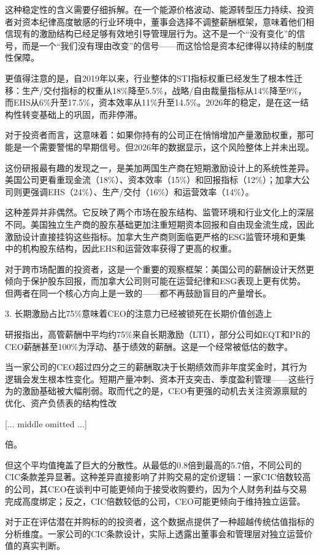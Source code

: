 \documentclass[11pt]{ctexart}
\begin{document}
这种稳定性的含义需要仔细拆解。在一个能源价格波动、能源转型压力持续、投资者对资本纪律高度敏感的行业环境中，董事会选择不调整薪酬框架，意味着他们相信现有的激励结构已经足够有效地引导管理层行为。这不是一个“没有变化”的信号，而是一个“我们没有理由改变”的信号——而这恰恰是资本纪律得以持续的制度性保障。

更值得注意的是，自2019年以来，行业整体的STI指标权重已经发生了根本性迁移：生产/交付指标的权重从18\%降至5.5\%，战略/自由裁量指标从14\%降至9\%，而EHS从6\%升至17.5\%，资本效率从11\%升至14.5\%。2026年的稳定，是在这一结构性转变基础上的巩固，而非停滞。

对于投资者而言，这意味着：如果你持有的公司正在悄悄增加产量激励权重，那可能是一个需要警惕的早期信号。但2026年的数据显示，这个风险整体上并未出现。

这份研报最有趣的发现之一，是美加两国生产商在短期激励设计上的系统性差异。美国公司更看重现金流（18\%）、资本效率（15\%）和回报指标（12\%）；加拿大公司则更强调EHS（24\%）、生产/交付（16\%）和运营效率（14\%）。

这种差异并非偶然。它反映了两个市场在股东结构、监管环境和行业文化上的深层不同。美国独立生产商的股东基础更加注重短期资本回报和自由现金流生成，因此激励设计直接挂钩这些指标。加拿大生产商则面临更严格的ESG监管环境和更集中的机构股东结构，因此EHS和运营效率获得了更高的权重。

对于跨市场配置的投资者，这是一个重要的观察框架：美国公司的薪酬设计天然更倾向于保护股东回报，而加拿大公司则可能在运营纪律和ESG表现上更有优势。但两者在同一个核心方向上是一致的——都不再鼓励盲目的产量增长。

3. 长期激励占比75\%意味着CEO的注意力已经被锁死在长期价值创造上

研报指出，高管薪酬中平均约75\%来自长期激励（LTI），部分公司如EQT和PR的CEO薪酬甚至100\%为浮动、基于绩效的薪酬。这是一个经常被低估的数字。

当一家公司的CEO超过四分之三的薪酬取决于长期绩效而非年度奖金时，其行为逻辑会发生根本性变化。短期产量冲刺、资本开支突击、季度盈利管理——这些行为的激励基础被大幅削弱。取而代之的是，CEO有更强的动机去关注资源禀赋的优化、资产负债表的结构性改

[... middle omitted ...]

倍。

但这个平均值掩盖了巨大的分散性。从最低的0.8倍到最高的5.7倍，不同公司的CIC条款差异显著。这种差异直接影响了并购交易的定价逻辑：一家CIC倍数较高的公司，其CEO在谈判中可能更倾向于接受收购要约，因为个人财务利益与交易完成高度绑定；反之，CIC倍数较低的公司，CEO可能更倾向于维持独立运营。

对于正在评估潜在并购标的的投资者，这个数据点提供了一种超越传统估值指标的分析维度。一家公司的CIC条款设计，实际上透露出董事会和管理层对独立运营价值的真实判断。
\end{document}

